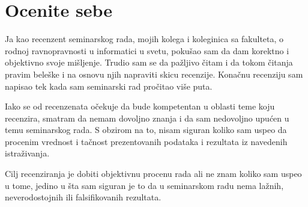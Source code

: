 \documentclass[a4paper]{report}
\begin{document}
\section{Ocenite sebe}

Ja kao recenzent seminarskog rada, mojih kolega i koleginica sa fakulteta, o rodnoj ravnopravnosti u informatici u svetu, pokušao sam da dam korektno i objektivno svoje mišljenje. Trudio sam se da pažljivo čitam i da tokom čitanja pravim beleške i na osnovu njih napraviti skicu recenzije. Konačnu recenziju sam napisao tek kada sam seminarski rad pročitao više puta.

Iako se od recenzenata očekuje da bude kompetentan u oblasti teme koju recenzira, smatram da nemam dovoljno znanja i da sam nedovoljno upućen u temu seminarskog rada. S obzirom na to, nisam siguran koliko sam uspeo da procenim vrednost i tačnost prezentovanih podataka i rezultata iz navedenih istraživanja.

Cilj recenziranja je dobiti objektivnu procenu rada ali ne znam koliko sam uspeo u tome, jedino u šta sam siguran je to da u seminarskom radu nema lažnih, neverodostojnih ili falsifikovanih rezultata.
\end{document}

